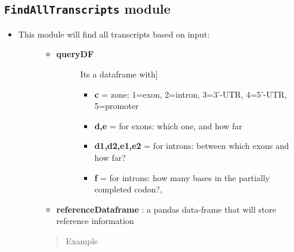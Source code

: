 \documentclass[letterpaper,10pt,english]{sphinxmanual}
\begin{document}
\subsection{\texttt{FindAllTranscripts} module}
\label{iAnnotateSV:findalltranscripts-module}\begin{itemize}
\item {} \begin{description}
\item[{This module will find all transcripts based on input:}] \leavevmode\begin{itemize}
\item {} \begin{description}
\item[{\textbf{queryDF}}] \leavevmode{[}Its a dataframe with{]}\begin{itemize}
\item {} 
\textbf{c} = zone: 1=exon, 2=intron, 3=3'-UTR, 4=5'-UTR, 5=promoter

\item {} 
\textbf{d,e} = for exons: which one, and how far

\item {} 
\textbf{d1,d2,e1,e2} = for introns: between which exons and how far?

\item {} 
\textbf{f} = for introns: how many bases in the partially completed codon?,

\end{itemize}

\end{description}

\item {} 
\textbf{referenceDataframe} : a pandas data-frame that will store reference information

\end{itemize}
\begin{quote}\begin{description}
\item[{Example}] \leavevmode
{}

\end{description}\end{quote}

\end{description}

\end{itemize}
\end{document}
